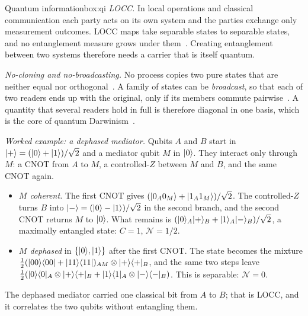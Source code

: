 \begin{primer}{Quantum information}{box:qi}
\emph{LOCC.} In local operations and classical communication each party acts on its own system and the parties exchange only measurement
outcomes. LOCC maps take separable states to separable states, and no entanglement measure grows under them~\cite{vw,horodecki2009}.
Creating entanglement between two systems therefore needs a carrier that is itself quantum.

\emph{No-cloning and no-broadcasting.} No process copies two pure states that are neither equal nor orthogonal~\cite{wz,dieks}. A family
of states can be \emph{broadcast}, so that each of two readers ends up with the original, only if its members commute pairwise~\cite{barnum}.
A quantity that several readers hold in full is therefore diagonal in one basis, which is the core of quantum Darwinism~\cite{zurek}.

\emph{Worked example: a dephased mediator.} Qubits $A$ and $B$ start in $\lvert +\rangle=(\lvert 0\rangle+\lvert 1\rangle)/\sqrt2$ and a mediator qubit $M$ in $\lvert 0\rangle$.
They interact only through $M$: a CNOT from $A$ to $M$, a controlled-$Z$ between $M$ and $B$, and the same CNOT again.
\begin{itemize}[nosep,leftmargin=*]
\item \emph{$M$ coherent.} The first CNOT gives $(\lvert 0_A0_M\rangle+\lvert 1_A1_M\rangle)/\sqrt2$. The controlled-$Z$ turns $B$ into
$\lvert -\rangle=(\lvert 0\rangle-\lvert 1\rangle)/\sqrt2$ in the second branch, and the second CNOT returns $M$ to $\lvert 0\rangle$. What remains is
$(\lvert 0\rangle_A\lvert +\rangle_B+\lvert 1\rangle_A\lvert -\rangle_B)/\sqrt2$, a maximally entangled state: $C=1$, $\mathcal N=1/2$.
\item \emph{$M$ dephased} in $\{\lvert 0\rangle,\lvert 1\rangle\}$ after the first CNOT. The state becomes the mixture
$\tfrac12(\lvert 00\rangle\langle 00\rvert+\lvert 11\rangle\langle 11\rvert)_{AM}\otimes\lvert +\rangle\langle +\rvert_B$, and the same two steps leave
$\tfrac12(\lvert 0\rangle\langle 0\rvert_A\otimes\lvert +\rangle\langle +\rvert_B+\lvert 1\rangle\langle 1\rvert_A\otimes\lvert -\rangle\langle -\rvert_B)$. This is separable: $\mathcal N=0$.
\end{itemize}
The dephased mediator carried one classical bit from $A$ to $B$; that is LOCC, and it correlates the two qubits without entangling them.
\end{primer}
